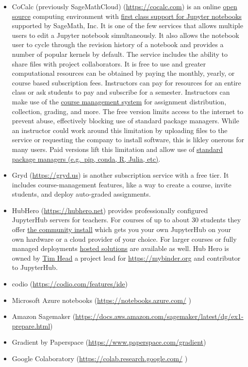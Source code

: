 \documentclass[]{book}
\begin{document}
\begin{itemize}
\item
  CoCalc (previously SageMathCloud) (\url{https://cocalc.com}) is an
  online \href{https://github.com/sagemathinc/}{open source} computing
  environment with
  \href{https://cocalc.com/doc/jupyter-notebook.html}{first class
  support for Jupyter notebooks} supported by SageMath, Inc. It is one
  of the few services that allows multiple users to edit a Jupyter
  notebook simultaneously. It also allows the notebook user to cycle
  through the revision history of a notebook and provides a number of
  popular kernels by default. The service includes the ability to share
  files with project collaborators. It is free to use and greater
  computational resources can be obtained by paying the monthly, yearly,
  or course based subscription fees. Instructors can pay for resources
  for an entire class or ask students to pay and subscribe for a
  semester. Instructors can make use of the
  \href{https://tutorial.cocalc.com/}{course management system} for
  assignment distribution, collection, grading, and more. The free
  version limits access to the internet to prevent abuse, effectively
  blocking use of standard package managers. While an instructor could
  work around this limitation by uploading files to the service or
  requesting the company to install software, this is likley onerous for
  many users. Paid versions lift this limitation and allow use of
  \href{https://github.com/sagemathinc/cocalc/wiki/How-to-Install-Python-Packages-into-CoCalc}{standard
  package managers (e.g.~pip, conda, R, Julia, etc)}.
\item
  Gryd (\url{https://gryd.us}) is another subscription service with a
  free tier. It includes course-management features, like a way to
  create a course, invite students, and deploy auto-graded assignments.
\item
  HubHero (\url{https://hubhero.net}) provides professionally configured
  JupyterHub servers for teachers. For courses of up to about 30
  students they offer \href{https://hubhero.net/community/}{the
  community install} which gets you your own JupyterHub on your own
  hardware or a cloud provider of your choice. For larger courses or
  fully managed deployments \href{https://hubhero.net/hosted/}{hosted
  solutions} are available as well. Hub Hero is owned by
  \href{https://github.com/betatim/}{Tim Head} a project lead for
  \url{https://mybinder.org} and contributor to JupyterHub.
\item
  codio (\url{https://codio.com/features/ide})
\item
  Microsoft Azure notebooks (\url{https://notebooks.azure.com/} )
\item
  Amazon Sagemaker
  (\url{https://docs.aws.amazon.com/sagemaker/latest/dg/ex1-prepare.html})
\item
  Gradient by Paperspace (\url{https://www.paperspace.com/gradient})
\item
  Google Colaboratory (\url{https://colab.research.google.com/} )
\end{itemize}
\end{document}
